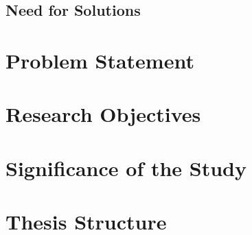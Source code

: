 
\subsection{Need for Solutions}


\section{Problem Statement}


\section{Research Objectives}


\section{Significance of the Study}


\section{Thesis Structure}

